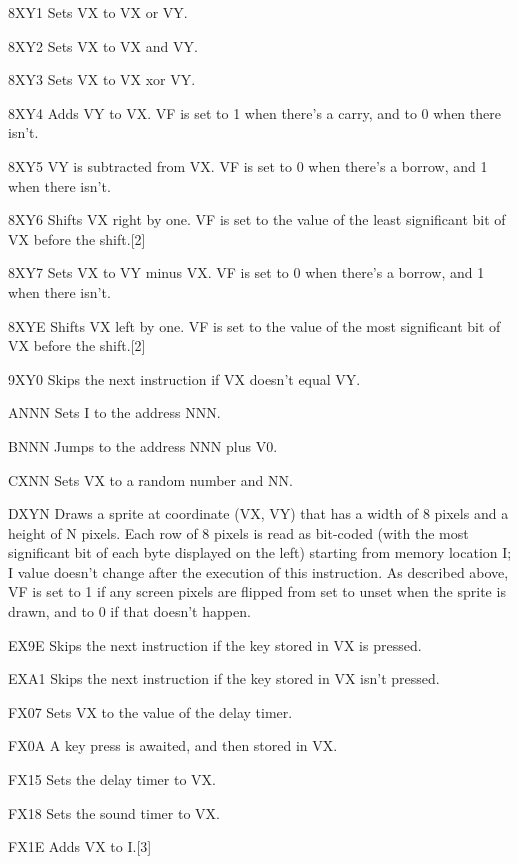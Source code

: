  8\-X\-Y1 Sets V\-X to V\-X or V\-Y. \par
 8\-X\-Y2 Sets V\-X to V\-X and V\-Y. \par
 8\-X\-Y3 Sets V\-X to V\-X xor V\-Y. \par
 8\-X\-Y4 Adds V\-Y to V\-X. V\-F is set to 1 when there's a carry, and to 0 when there isn't. \par
 8\-X\-Y5 V\-Y is subtracted from V\-X. V\-F is set to 0 when there's a borrow, and 1 when there isn't. \par
 8\-X\-Y6 Shifts V\-X right by one. V\-F is set to the value of the least significant bit of V\-X before the shift.\mbox{[}2\mbox{]} \par
 8\-X\-Y7 Sets V\-X to V\-Y minus V\-X. V\-F is set to 0 when there's a borrow, and 1 when there isn't. \par
 8\-X\-Y\-E Shifts V\-X left by one. V\-F is set to the value of the most significant bit of V\-X before the shift.\mbox{[}2\mbox{]} \par
 9\-X\-Y0 Skips the next instruction if V\-X doesn't equal V\-Y. \par
 A\-N\-N\-N Sets I to the address N\-N\-N. \par
 B\-N\-N\-N Jumps to the address N\-N\-N plus V0. \par
 C\-X\-N\-N Sets V\-X to a random number and N\-N. \par
 D\-X\-Y\-N Draws a sprite at coordinate (V\-X, V\-Y) that has a width of 8 pixels and a height of N pixels. Each row of 8 pixels is read as bit-\/coded (with the most significant bit of each byte displayed on the left) starting from memory location I; I value doesn't change after the execution of this instruction. As described above, V\-F is set to 1 if any screen pixels are flipped from set to unset when the sprite is drawn, and to 0 if that doesn't happen. \par
 E\-X9\-E Skips the next instruction if the key stored in V\-X is pressed. \par
 E\-X\-A1 Skips the next instruction if the key stored in V\-X isn't pressed. \par
 F\-X07 Sets V\-X to the value of the delay timer.\par
 F\-X0\-A A key press is awaited, and then stored in V\-X. \par
 F\-X15 Sets the delay timer to V\-X. \par
 F\-X18 Sets the sound timer to V\-X. \par
 F\-X1\-E Adds V\-X to I.\mbox{[}3\mbox{]} \par
